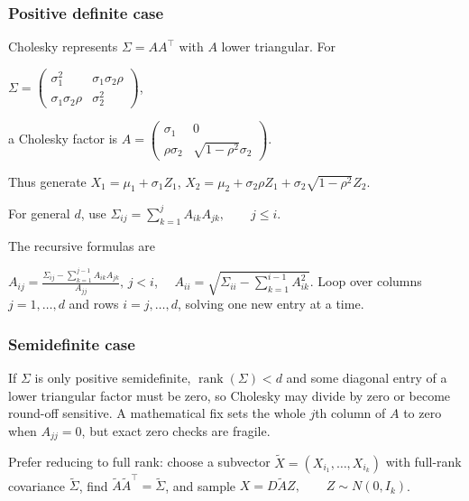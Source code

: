 \subsubsection*{Positive definite case}

Cholesky represents $\Sigma=AA^\top$ with $A$ lower triangular. For

$\Sigma=\begin{pmatrix}\sigma_1^2&\sigma_1\sigma_2\rho\\ \sigma_1\sigma_2\rho&\sigma_2^2\end{pmatrix}$,

a Cholesky factor is
$A=\begin{pmatrix}\sigma_1&0\\ \rho\sigma_2&\sqrt{1-\rho^2}\sigma_2\end{pmatrix}$.

Thus generate
$X_1=\mu_1+\sigma_1Z_1$,
$X_2=\mu_2+\sigma_2\rho Z_1+\sigma_2\sqrt{1-\rho^2}Z_2$.

For general $d$, use
$\Sigma_{ij}=\sum_{k=1}^jA_{ik}A_{jk},\qquad j\le i$.

The recursive formulas are

$A_{ij}=\frac{\Sigma_{ij}-\sum_{k=1}^{j-1}A_{ik}A_{jk}}{A_{jj}},\, j<i$,
$\quad A_{ii}=\sqrt{\Sigma_{ii}-\sum_{k=1}^{i-1}A_{ik}^2}$.
Loop over columns $j=1,\ldots,d$ and rows $i=j,\ldots,d$, solving one new entry at a time.

\subsubsection*{Semidefinite case}

If $\Sigma$ is only positive semidefinite, $\operatorname{rank}(\Sigma)<d$ and some diagonal entry of a lower triangular factor must be zero, so Cholesky may divide by zero or become round-off sensitive. A mathematical fix sets the whole $j$th column of $A$ to zero when $A_{jj}=0$, but exact zero checks are fragile.

Prefer reducing to full rank: choose a subvector $\tilde{X}=(X_{i_1},\ldots,X_{i_k})$ with full-rank covariance $\tilde{\Sigma}$, find $\tilde{A}\tilde{A}^\top=\tilde{\Sigma}$, and sample
$X=D\tilde{A}Z,\qquad Z\sim N(0,I_k)$.
